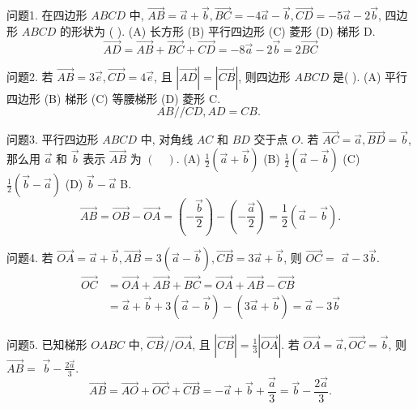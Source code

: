 
问题1. 在四边形 $A B C D$ 中, $\overrightarrow{A B}=\vec{a}+\vec{b}, \overrightarrow{B C}=-4 \vec{a}-\vec{b}, \overrightarrow{C D}=-5 \vec{a}-2 \vec{b}$, 四边形 $A B C D$ 的形状为 ( ).
(A) 长方形
(B) 平行四边形
(C) 菱形
(D) 梯形
D.
$$
\overrightarrow{A D}=\overrightarrow{A B}+\overrightarrow{B C}+\overrightarrow{C D}=-8 \vec{a}-2 \vec{b}=2 \overrightarrow{B C}
$$



问题2. 若 $\overrightarrow{A B}=3 \vec{e}, \overrightarrow{C D}=4 \vec{e}$, 且 $|\overrightarrow{A D}|=|\overrightarrow{C B}|$, 则四边形 $A B C D$ 是( ).
(A) 平行四边形
(B) 梯形
(C) 等腰梯形
(D) 菱形
C.
$$
A B / / C D, A D=C B \text {. }
$$



问题3. 平行四边形 $A B C D$ 中, 对角线 $A C$ 和 $B D$ 交于点 $O$. 若 $\overrightarrow{A C}=\vec{a}, \overrightarrow{B D}=\vec{b}$, 那么用 $\vec{a}$ 和 $\vec{b}$ 表示 $\overrightarrow{A B}$ 为 $(\quad)$.
(A) $\frac{1}{2}(\vec{a}+\vec{b})$
(B) $\frac{1}{2}(\vec{a}-\vec{b})$
(C) $\frac{1}{2}(\vec{b}-\vec{a})$
(D) $\vec{b}-\vec{a}$
B.
$$
\overrightarrow{A B}=\overrightarrow{O B}-\overrightarrow{O A}=\left(-\frac{\vec{b}}{2}\right)-\left(-\frac{\vec{a}}{2}\right)=\frac{1}{2}(\vec{a}-\vec{b}) .
$$



问题4. 若 $\overrightarrow{O A}=\vec{a}+\vec{b}, \overrightarrow{A B}=3(\vec{a}-\vec{b}), \overrightarrow{C B}=3 \vec{a}+\vec{b}$, 则 $\overrightarrow{O C}=$
$\vec{a}-3 \vec{b}$.
$$
\begin{aligned}
\overrightarrow{O C} & =\overrightarrow{O A}+\overrightarrow{A B}+\overrightarrow{B C}=\overrightarrow{O A}+\overrightarrow{A B}-\overrightarrow{C B} \\
& =\vec{a}+\vec{b}+3(\vec{a}-\vec{b})-(3 \vec{a}+\vec{b})=\vec{a}-3 \vec{b}
\end{aligned}
$$



问题5. 已知梯形 $O A B C$ 中, $\overrightarrow{C B} / / \overrightarrow{O A}$, 且 $|\overrightarrow{C B}|=\frac{1}{3}|\overrightarrow{O A}|$. 若 $\overrightarrow{O A}=\vec{a}, \overrightarrow{O C}= \vec{b}$, 则 $\overrightarrow{A B}=$
$\vec{b}-\frac{2 \vec{a}}{3}$.
$$
\overrightarrow{A B}=\overrightarrow{A O}+\overrightarrow{O C}+\overrightarrow{C B}=-\vec{a}+\vec{b}+\frac{\vec{a}}{3}=\vec{b}-\frac{2 \vec{a}}{3} .
$$



